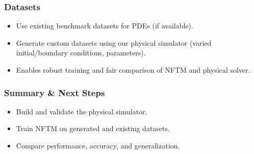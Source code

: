 \documentclass{beamer}
\begin{document}
\begin{frame}
\frametitle{Datasets}
\begin{itemize}
  \item Use existing benchmark datasets for PDEs (if available).
  \item Generate custom datasets using our physical simulator (varied initial/boundary conditions, parameters).
  \item Enables robust training and fair comparison of NFTM and physical solver.
\end{itemize}
\end{frame}


\begin{frame}
\frametitle{Summary \& Next Steps}
\begin{itemize}
  \item Build and validate the physical simulator.
  \item Train NFTM on generated and existing datasets.
  \item Compare performance, accuracy, and generalization.
\end{itemize}
\end{frame}
\end{document}
